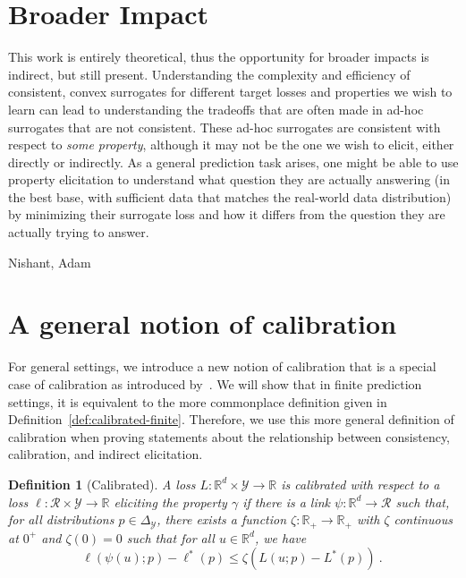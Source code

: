 \documentclass{article}
\newcommand{\reals}{\mathbb{R}}
\newcommand{\simplex}{\Delta_\Y}
\newcommand{\R}{\mathcal{R}}
\newcommand{\Y}{\mathcal{Y}}
\newcommand{\risk}[1]{#1^*}
\newtheorem{definition}{Definition}
\begin{document}
\newpage

\section*{Broader Impact}
This work is entirely theoretical, thus the opportunity for broader impacts is indirect, but still present.
Understanding the complexity and efficiency of consistent, convex surrogates for different target losses and properties we wish to learn can lead to understanding the tradeoffs that are often made in ad-hoc surrogates that are not consistent.
These ad-hoc surrogates are consistent with respect to \emph{some property}, although it may not be the one we wish to elicit, either directly or indirectly.
As a general prediction task arises, one might be able to use property elicitation to understand what question they are actually answering (in the best base, with sufficient data that matches the real-world data distribution) by minimizing their surrogate loss and how it differs from the question they are actually trying to answer.

\begin{ack}
Nishant, Adam
\end{ack}




\newpage
\appendix
\section{A general notion of calibration}\label{app:calibration}
For general settings, we introduce a new notion of calibration that is a special case of calibration as introduced by~\cite[Chapter 3]{steinwart2008support}.
We will show that in finite prediction settings, it is equivalent to the more commonplace definition given in Definition~\ref{def:calibrated-finite}.
Therefore, we use this more general definition of calibration when proving statements about the relationship between consistency, calibration, and indirect elicitation.

\begin{definition}[Calibrated]\label{def:calibrated-general}
	A loss $L:\reals^d \times \Y \to \reals$ is \emph{calibrated} with respect to a loss $\ell : \R \times \Y \to \reals$ eliciting the property $\gamma$ if there is a link $\psi : \reals^d \to \R$ such that, for all distributions $p \in \simplex$, there exists a function $\zeta : \reals_+ \to \reals_+$ with $\zeta$ continuous at $0^+$ and $\zeta(0) = 0$ such that for all $u \in \reals^d$, we have
	\begin{equation}\label{eq:calibrated-general}
	\ell( \psi(u); p) - \risk{\ell}(p)  \leq \zeta \left(  L(u;p) - \risk{L}(p) \right)~.~
	\end{equation}
\end{definition}
\end{document}
